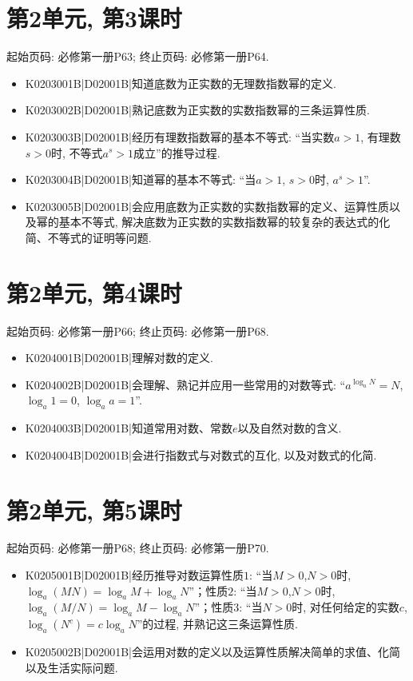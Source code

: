 \section*{第2单元, 第3课时}
起始页码: 必修第一册P63; 终止页码: 必修第一册P64.
\begin{itemize}
\item K0203001B|D02001B|知道底数为正实数的无理数指数幂的定义.
\item K0203002B|D02001B|熟记底数为正实数的实数指数幂的三条运算性质.
\item K0203003B|D02001B|经历有理数指数幂的基本不等式: ``当实数$a>1$, 有理数$s>0$时, 不等式$a^s>1$成立''的推导过程.
\item K0203004B|D02001B|知道幂的基本不等式: ``当$a>1$, $s>0$时, $a^s>1$''.
\item K0203005B|D02001B|会应用底数为正实数的实数指数幂的定义、运算性质以及幂的基本不等式, 解决底数为正实数的实数指数幂的较复杂的表达式的化简、不等式的证明等问题.
\end{itemize}

\section*{第2单元, 第4课时}
起始页码: 必修第一册P66; 终止页码: 必修第一册P68.
\begin{itemize}
\item K0204001B|D02001B|理解对数的定义.
\item K0204002B|D02001B|会理解、熟记并应用一些常用的对数等式: ``$a^{\log_aN}=N$, $\log_a1=0$, $\log_aa=1$''.
\item K0204003B|D02001B|知道常用对数、常数$e$以及自然对数的含义.
\item K0204004B|D02001B|会进行指数式与对数式的互化, 以及对数式的化简.
\end{itemize}

\section*{第2单元, 第5课时}
起始页码: 必修第一册P68; 终止页码: 必修第一册P70.
\begin{itemize}
\item K0205001B|D02001B|经历推导对数运算性质$1$: ``当$M>0$,$N>0$时, $\log_a(MN)=\log_aM+\log_aN$''；性质$2$: ``当$M>0$,$N>0$时, $\log_a(M/N)=\log_aM-\log_aN$''；性质$3$: ``当$N>0$时, 对任何给定的实数$c$, $\log_a(N^{c})=c\log_aN$''的过程, 并熟记这三条运算性质.
\item K0205002B|D02001B|会运用对数的定义以及运算性质解决简单的求值、化简以及生活实际问题.
\end{itemize}

